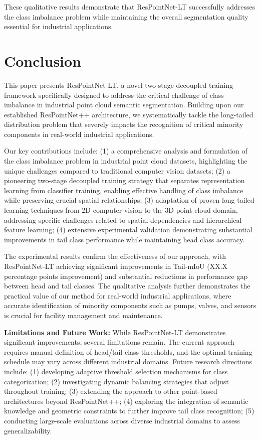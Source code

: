 \documentclass[preprint,12pt]{elsarticle}
\begin{document}
These qualitative results demonstrate that ResPointNet-LT successfully addresses the class imbalance problem while maintaining the overall segmentation quality essential for industrial applications.

\section{Conclusion}
\label{sec:conclusion}

This paper presents ResPointNet-LT, a novel two-stage decoupled training framework specifically designed to address the critical challenge of class imbalance in industrial point cloud semantic segmentation. Building upon our established ResPointNet++ architecture, we systematically tackle the long-tailed distribution problem that severely impacts the recognition of critical minority components in real-world industrial applications.

Our key contributions include: (1) a comprehensive analysis and formulation of the class imbalance problem in industrial point cloud datasets, highlighting the unique challenges compared to traditional computer vision datasets; (2) a pioneering two-stage decoupled training strategy that separates representation learning from classifier training, enabling effective handling of class imbalance while preserving crucial spatial relationships; (3) adaptation of proven long-tailed learning techniques from 2D computer vision to the 3D point cloud domain, addressing specific challenges related to spatial dependencies and hierarchical feature learning; (4) extensive experimental validation demonstrating substantial improvements in tail class performance while maintaining head class accuracy.

The experimental results confirm the effectiveness of our approach, with ResPointNet-LT achieving significant improvements in Tail-mIoU (XX.X percentage points improvement) and substantial reductions in performance gap between head and tail classes. The qualitative analysis further demonstrates the practical value of our method for real-world industrial applications, where accurate identification of minority components such as pumps, valves, and sensors is crucial for facility management and maintenance.

\textbf{Limitations and Future Work:} While ResPointNet-LT demonstrates significant improvements, several limitations remain. The current approach requires manual definition of head/tail class thresholds, and the optimal training schedule may vary across different industrial domains. Future research directions include: (1) developing adaptive threshold selection mechanisms for class categorization; (2) investigating dynamic balancing strategies that adjust throughout training; (3) extending the approach to other point-based architectures beyond ResPointNet++; (4) exploring the integration of semantic knowledge and geometric constraints to further improve tail class recognition; (5) conducting large-scale evaluations across diverse industrial domains to assess generalizability.
\end{document}
